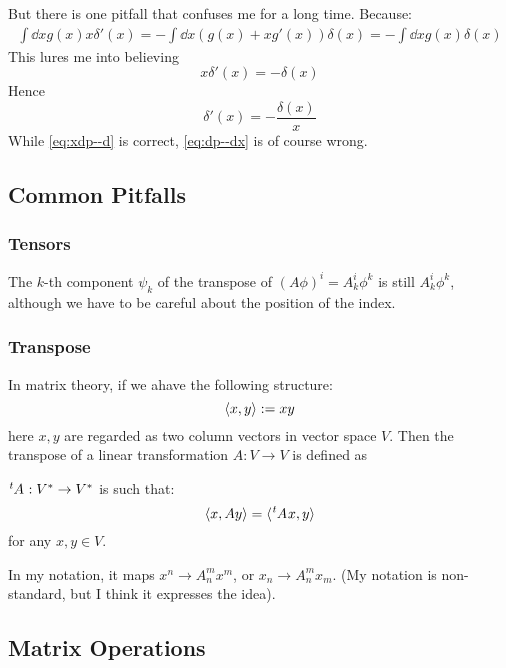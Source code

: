 But there is one pitfall that confuses me for a long time. Because:
\begin{align*}
    \int\dd{x}g(x)x\delta'(x) = -\int\dd{x}(g(x)+xg'(x))\delta(x)
    = -\int\dd{x}g(x)\delta(x)
\end{align*}
This lures me into believing
\begin{equation}
    x\delta'(x) = -\delta(x)
    \label{eq:xdp--d}
\end{equation}
Hence
\begin{equation}
    \delta'(x) = -\frac{\delta(x)}{x}
    \label{eq:dp--dx}
\end{equation}
While \ref{eq:xdp--d} is correct, \ref{eq:dp--dx} is of course wrong.
\subsection{Common Pitfalls}
\label{sec:Common Pitfalls}
    \subsubsection{Tensors}
    \label{sec:Tensors}
    
    The $k$-th component $\psi_k$ of the transpose of $(A\phi)^i = A^i_k
    \phi^k$ is still $A^i_k \phi^k$, although we have to be careful about
    the position of the index.

    \subsubsection{Transpose}
    \label{sec:Transpose}
    
    In matrix theory, if we ahave the following structure:
    $$\braket{x,y} := x y$$
    here $x,y$ are regarded as two column vectors in vector space $V$.
    Then the transpose of a linear transformation $A:V\to V$ is defined
    as
    \begin{defi}[Transpose]
        $\tensor[^t]{A}{}:V^* \to V^*$ is such that:
        \begin{equation}
            \braket{x,Ay} = \braket{\tensor[^t]{A}{}x,y}
        \end{equation}
        for any $x,y\in V$.
    \end{defi}

    In my notation, it maps $x^n\to A^m_n x^m$, or $x_n\to A^m_n x_m$.
    (My notation is non-standard, but I think it expresses the idea).


\subsection{Matrix Operations}
